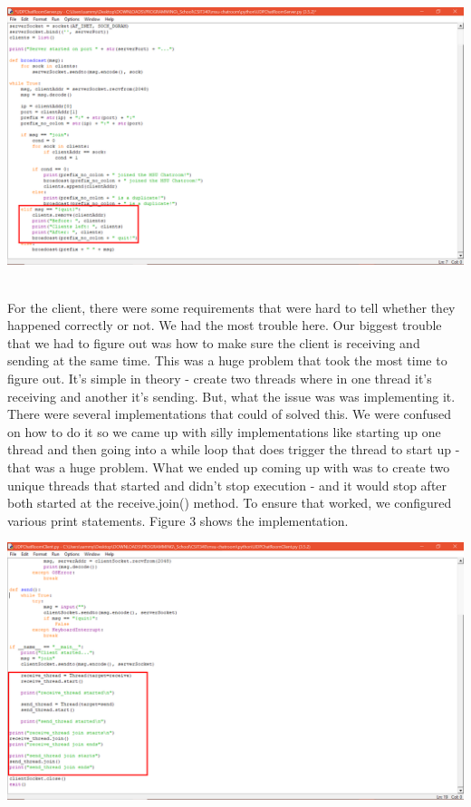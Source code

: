 \documentclass[12pt]{report}
\begin{document}
\begin{center}
\includegraphics[scale=.25]{test-case-quit.png}\\
\end{center} \\

\noindent
For the client, there were some requirements that were hard to tell whether they happened correctly or not. We had the most trouble here. Our biggest trouble that we had to figure out was how to make sure the client is receiving and sending at the same time. This was a huge problem that took the most time to figure out. It's simple in theory - create two threads where in one thread it's receiving and another it's sending. But, what the issue was was implementing it. There were several implementations that could of solved this. We were confused on how to do it so we came up with silly implementations like starting up one thread and then going into a while loop that does trigger the thread to start up - that was a huge problem. What we ended up coming up with was to create two unique threads that started and didn't stop execution - and it would stop after both started at the receive.join() method. To ensure that worked, we configured various print statements. Figure 3 shows the implementation. \\

\begin{center}
\includegraphics[scale=.25]{test-case-threads.png}\\
\end{center} \\
\end{document}
